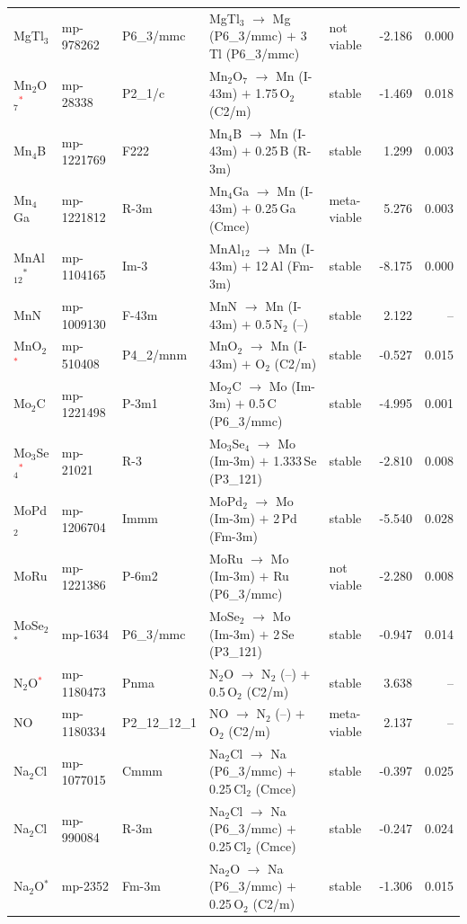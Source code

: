 \begin{longtable}{@{}ll l@{\hspace{4pt}} p{4.6cm} l@{\hspace{4pt}} rr@{}}
MgTl$_{3}$ & mp-978262 & P6\_3/mmc & MgTl$_{3}$ $\to$ Mg (P6\_3/mmc) $+$ 3\,Tl (P6\_3/mmc) & not viable & -2.186 & 0.000 \\
Mn$_{2}$O$_{7}$\textcolor{red}{$^*$} & mp-28338 & P2\_1/c & Mn$_{2}$O$_{7}$ $\to$ Mn (I-43m) $+$ 1.75\,O$_{2}$ (C2/m) & stable & -1.469 & 0.018 \\
Mn$_{4}$B & mp-1221769 & F222 & Mn$_{4}$B $\to$ Mn (I-43m) $+$ 0.25\,B (R-3m) & stable & 1.299 & 0.003 \\
Mn$_{4}$Ga & mp-1221812 & R-3m & Mn$_{4}$Ga $\to$ Mn (I-43m) $+$ 0.25\,Ga (Cmce) & meta-viable & 5.276 & 0.003 \\
MnAl$_{12}$$^*$ & mp-1104165 & Im-3 & MnAl$_{12}$ $\to$ Mn (I-43m) $+$ 12\,Al (Fm-3m) & stable & -8.175 & 0.000 \\
MnN & mp-1009130 & F-43m & MnN $\to$ Mn (I-43m) $+$ 0.5\,N$_{2}$ (--) & stable & 2.122 & -- \\
MnO$_{2}$\textcolor{red}{$^*$} & mp-510408 & P4\_2/mnm & MnO$_{2}$ $\to$ Mn (I-43m) $+$ O$_{2}$ (C2/m) & stable & -0.527 & 0.015 \\
Mo$_{2}$C & mp-1221498 & P-3m1 & Mo$_{2}$C $\to$ Mo (Im-3m) $+$ 0.5\,C (P6\_3/mmc) & stable & -4.995 & 0.001 \\
Mo$_{3}$Se$_{4}$\textcolor{red}{$^*$} & mp-21021 & R-3 & Mo$_{3}$Se$_{4}$ $\to$ Mo (Im-3m) $+$ 1.333\,Se (P3\_121) & stable & -2.810 & 0.008 \\
MoPd$_{2}$ & mp-1206704 & Immm & MoPd$_{2}$ $\to$ Mo (Im-3m) $+$ 2\,Pd (Fm-3m) & stable & -5.540 & 0.028 \\
MoRu & mp-1221386 & P-6m2 & MoRu $\to$ Mo (Im-3m) $+$ Ru (P6\_3/mmc) & not viable & -2.280 & 0.008 \\
MoSe$_{2}$$^*$ & mp-1634 & P6\_3/mmc & MoSe$_{2}$ $\to$ Mo (Im-3m) $+$ 2\,Se (P3\_121) & stable & -0.947 & 0.014 \\
N$_{2}$O\textcolor{red}{$^*$} & mp-1180473 & Pnma & N$_{2}$O $\to$ N$_{2}$ (--) $+$ 0.5\,O$_{2}$ (C2/m) & stable & 3.638 & -- \\
NO & mp-1180334 & P2\_12\_12\_1 & NO $\to$ N$_{2}$ (--) $+$ O$_{2}$ (C2/m) & meta-viable & 2.137 & -- \\
Na$_{2}$Cl & mp-1077015 & Cmmm & Na$_{2}$Cl $\to$ Na (P6\_3/mmc) $+$ 0.25\,Cl$_{2}$ (Cmce) & stable & -0.397 & 0.025 \\
Na$_{2}$Cl & mp-990084 & R-3m & Na$_{2}$Cl $\to$ Na (P6\_3/mmc) $+$ 0.25\,Cl$_{2}$ (Cmce) & stable & -0.247 & 0.024 \\
Na$_{2}$O$^*$ & mp-2352 & Fm-3m & Na$_{2}$O $\to$ Na (P6\_3/mmc) $+$ 0.25\,O$_{2}$ (C2/m) & stable & -1.306 & 0.015 \\

\end{longtable}
